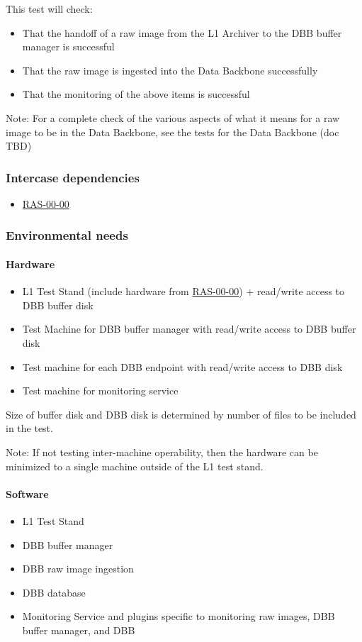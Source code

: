 \documentclass[DM,lsstdraft,STS,toc]{lsstdoc}
\begin{document}
This test will check:
\begin{itemize}
\item{That the handoff of a raw image from the L1 Archiver to the DBB buffer
manager is successful}
\item{That the raw image is ingested into the Data Backbone successfully}
\item{That the monitoring of the above items is successful}
\end{itemize}


Note: For a complete check of the various aspects of what it means for
a raw image to be in the Data Backbone, see the tests for the Data Backbone (doc TBD)


\subsubsection{Intercase dependencies}
\begin{itemize}
\item{\hyperref[ras-00-00]{RAS-00-00}}
\end{itemize}


\subsubsection{Environmental needs}
\paragraph{Hardware}
\begin{itemize}
\item{L1 Test Stand (include hardware from \hyperref[ras-00-00]{RAS-00-00}) + read/write access to DBB buffer disk}
\item{Test Machine for DBB buffer manager with read/write access to DBB buffer disk}
\item{Test machine for each DBB endpoint with read/write access to DBB disk}
\item{Test machine for monitoring service}
\end{itemize}


Size of buffer disk and DBB disk is determined by number of files to be included in the test.


Note: If not testing inter-machine operability, then the hardware can be minimized
to a single machine outside of the L1 test stand.


\paragraph{Software}
\begin{itemize}
\item{L1 Test Stand}
\item{DBB buffer manager}
\item{DBB raw image ingestion}
\item{DBB database}
\item{Monitoring Service and plugins specific to monitoring raw images, DBB buffer manager, and DBB}
\end{itemize}
\end{document}
